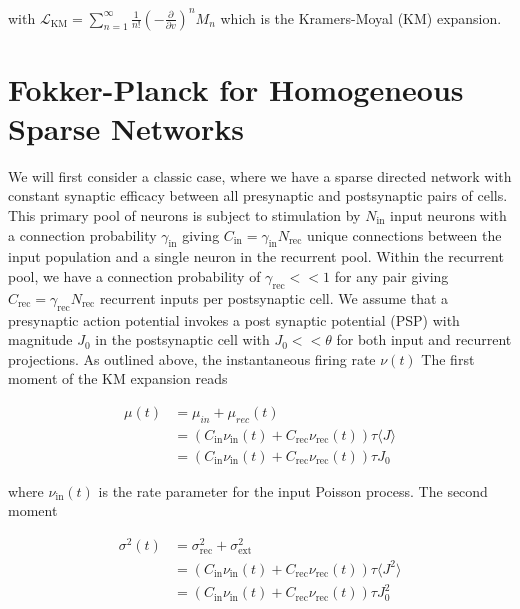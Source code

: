 \documentclass{ucetd}
\begin{document}
with $ \mathcal{L}_{\mathrm{KM}} =\sum_{n=1}^{\infty} \frac{1}{n!}\left(-\frac{\partial}{\partial v}\right)^{n} M_{n}$  which is the Kramers-Moyal (KM) expansion. 

\section{Fokker-Planck for Homogeneous Sparse Networks}

We will first consider a classic case, where we have a sparse directed network with constant synaptic efficacy between all presynaptic and postsynaptic pairs of cells. This primary pool of neurons is subject to stimulation by $N_{\mathrm{in}}$ input neurons with a connection probability $\gamma_{\mathrm{in}}$ giving $C_{\mathrm{in}} = \gamma_{\mathrm{in}}N_{\mathrm{rec}}$ unique connections between the input population and a single neuron in the recurrent pool. Within the recurrent pool, we have a connection probability of $\gamma_{\mathrm{rec}} << 1$ for any pair giving $C_{\mathrm{rec}} = \gamma_{\mathrm{rec}} N_{\mathrm{rec}}$ recurrent inputs per postsynaptic cell. We assume that a presynaptic action potential invokes a post synaptic potential (PSP) with magnitude $J_{0}$ in the postsynaptic cell with $J_{0} << \theta$ for both input and recurrent projections. As outlined above, the instantaneous firing rate $\nu(t)$ The first moment of the KM expansion reads

\begin{align*}
\mu(t) &= \mu_{in} + \mu_{rec}(t)\\
&= \left(C_{\mathrm{in}}\nu_{\mathrm{in}}(t) + C_{\mathrm{rec}}\nu_{\mathrm{rec}}(t)\right)\tau\langle J\rangle\\
&= \left(C_{\mathrm{in}}\nu_{\mathrm{in}}(t) + C_{\mathrm{rec}}\nu_{\mathrm{rec}}(t)\right)\tau J_{0}
\end{align*}

where $\nu_{\mathrm{in}}(t)$ is the rate parameter for the input Poisson process. The second moment

\begin{align*}
\sigma^{2}(t) &= \sigma_{\mathrm{rec}}^{2} + \sigma_{\mathrm{ext}}^{2}\\
&= \left(C_{\mathrm{in}}\nu_{\mathrm{in}}(t) + C_{\mathrm{rec}}\nu_{\mathrm{rec}}(t)\right)\tau\langle J^{2}\rangle\\
&= \left(C_{\mathrm{in}}\nu_{\mathrm{in}}(t) + C_{\mathrm{rec}}\nu_{\mathrm{rec}}(t)\right)\tau J_{0}^{2}
\end{align*}
\end{document}
